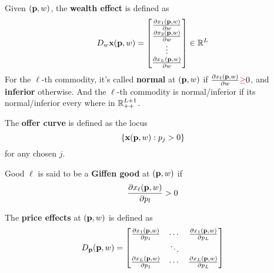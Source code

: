 \documentclass{article}
\begin{document}
 			\begin{definition}
 				Given $(\textbf{p}, w)$, the \textbf{wealth effect} is defined as
 				\begin{equation}
 					D_w \textbf{x}(\textbf{p}, w) 
 					= \begin{bmatrix}
 						\frac{\partial{x_1(\textbf{p}, w)}}{\partial{w}} \\
 						\frac{\partial{x_2(\textbf{p}, w)}}{\partial{w}} \\
 						\vdots \\
 						\frac{\partial{x_L(\textbf{p}, w)}}{\partial{w}}
 					\end{bmatrix} \in \mathbb{R}^L
 				\end{equation}
 				For the $\ell$-th commodity, it's called \textbf{normal} at $(\textbf{p}, w)$ if $\frac{\partial{x_{\ell}(\textbf{p}, w)}}{\partial{w}} \textcolor{red}{\geq} 0$, and \textbf{inferior} otherwise. And the $\ell$-th commodity is normal/inferior if its normal/inferior every where in $\mathbb{R}_{++}^{L+1}$. 
 			\end{definition}
 			
 			\begin{definition}
 				The \textbf{offer curve} is defined as the locus
 				\begin{equation}
 					\{\textbf{x}(\textbf{p}, w): p_j > 0\}
 				\end{equation}
 				for any chosen $j$.
 			\end{definition}
 			
 			\begin{definition}
 				Good $\ell$ is said to be a \textbf{Giffen good} at $(\textbf{p}, w)$ if
 				\begin{equation}
 					\frac{\partial{x_\ell(\textbf{p}, w)}}{\partial{p_l}} > 0
 				\end{equation}
 			\end{definition}
 			
 			\begin{definition}
 				The \textbf{price effects} at $(\textbf{p}, w)$ is defined as
 				\begin{equation}
 					D_{\textbf{p}} (\textbf{p}, w) = 
 					\begin{bmatrix}
 						\frac{\partial{x_1(\textbf{p}, w)}}{\partial{p_1}} & \cdots & \frac{\partial{x_1(\textbf{p}, w)}}{\partial{p_L}} \\
 						& \ddots & \\
 						\frac{\partial{x_L(\textbf{p}, w)}}{\partial{p_1}} & \cdots & \frac{\partial{x_L(\textbf{p}, w)}}{\partial{p_L}}
 					\end{bmatrix}
 				\end{equation}
 			\end{definition}
 			
\end{document}
